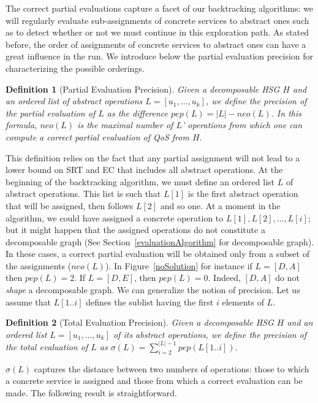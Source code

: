 \documentclass[a4paper]{article}
\newtheorem{definition}{Definition}
\begin{document}
The correct partial evaluations capture a facet of our backtracking algorithms: we will regularly evaluate sub-assignments 
of concrete services to abstract ones such as to detect whether or not we must continue in this exploration 
path. As stated before, the order of assignments of concrete services to abstract ones can have a great 
influence in the run. We introduce below the partial evaluation precision for characterizing the possible orderings. 

\begin{definition}[Partial Evaluation Precision]
Given a decomposable HSG $H$ and an ordered list of abstract operations $L = [ u_1, \dots, u_k ]$, 
we define the precision of the partial evaluation of $L$ as the difference $\displaystyle pep(L) = |L| - neo(L)$. 
In this formula, $neo(L)$ is the maximal number of $L$' operations from which one can compute a correct 
partial evaluation of QoS from $H$. 
\end{definition}

This definition relies on the fact that any partial assignment will not lead to a lower bound 
on SRT and EC that includes all abstract operations. At the beginning of the backtracking algorithm, we must define 
an ordered list $L$ of abstract operations. This list is such that $L[1]$ is the first abstract operation that will be 
assigned, then follows  $L[2]$ and so one. At a moment in the algorithm, we could have assigned a concrete 
operation to $L[1], L[2], \dots, L[i]$; but it might happen that the assigned operations do not 
constitute a decomposable graph (See Section~\ref{evaluationAlgorithm} for decomposable graph). 
In these cases, a correct partial evaluation will be obtained only 
from a subset of the assignments ($neo(L)$). In Figure~\ref{noSolution} for instance if $L = [D, A]$ 
then $pep(L) = 2$. If $L = [D, E]$, then $pep(L) = 0$. Indeed, $[D, A]$ do not {\it shape} a decomposable 
graph. 
We can generalize the notion of precision.
Let us assume that $L[1..i]$ defines the sublist having the first $i$ elements of $L$.  

\begin{definition}[Total Evaluation Precision]
Given a decomposable HSG $H$ and an ordered list $L = [ u_1, \dots, u_k ]$ of its abstract operations, 
we define the precision of the total evaluation of $L$ as $\displaystyle \sigma(L) = \sum_{i = 2}^{|L|-1} pep(L[1..i])$.
\end{definition}
$\sigma(L)$ captures the distance between two numbers of operations: those to 
which a concrete service is assigned and those from which a correct evaluation can be made. The following 
result is straightforward.
\end{document}
